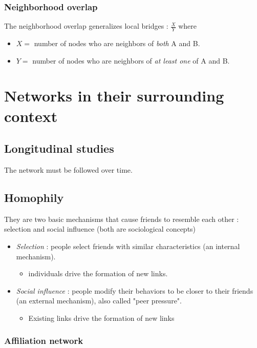 \subsection{Neighborhood overlap}

The neighborhood overlap generalizes local bridges :
$\frac{X}{Y}$ where
\begin{itemize}
\item $X =$ number of nodes who are neighbors of \textit{both} A and B.
\item $Y =$ number of nodes who are neighbors of \textit{at least one} of A and B.
\end{itemize}

\chapter{Networks in their surrounding context}

\section{Longitudinal studies}

The network must be followed over time.

\section{Homophily}

They are two basic mechanisms that cause friends to resemble each other : selection and social influence (both are sociological concepts)
\begin{itemize}
\item \textit{Selection} : people select friends with similar characteristics (an internal mechanism).
	\begin{itemize}
	\item individuals drive the formation of new links.
	\end{itemize}
\item \textit{Social influence} : people modify their behaviors to be closer to their friends (an external mechanism), also called "peer pressure".
	\begin{itemize}
	\item Existing links drive the formation of new links
	\end{itemize}
\end{itemize}

\subsection{Affiliation network}

